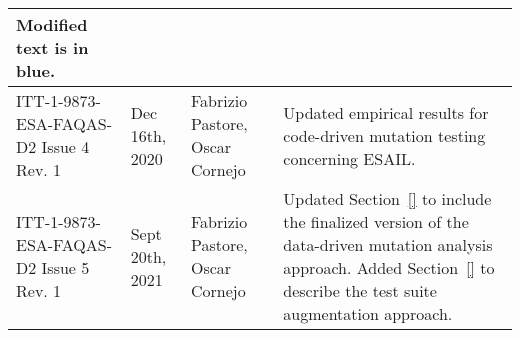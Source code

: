 \begin{longtable}{|p{2cm}|p{1cm}|p{1.5cm}|p{9cm}|@{}}
\begin{minipage}{8cm}
Modified text is in blue.
\end{minipage}

\\
\hline


ITT-1-9873-ESA-FAQAS-D2
Issue 4 Rev. 1
&Dec 16th, 2020
&Fabrizio Pastore, Oscar Cornejo
&
\begin{minipage}{8cm}
Updated empirical results for code-driven mutation testing concerning ESAIL.
\end{minipage}
\\

\hline

ITT-1-9873-ESA-FAQAS-D2
Issue 5 Rev. 1
&Sept 20th, 2021
&Fabrizio Pastore, Oscar Cornejo
&
\begin{minipage}{8cm}
Updated Section~\ref{} to include the finalized version of the data-driven mutation analysis approach.
Added Section~\ref{} to describe the test suite augmentation approach.

\end{minipage}
\\

\hline
                                                    
\end{longtable}
\normalsize

\clearpage
